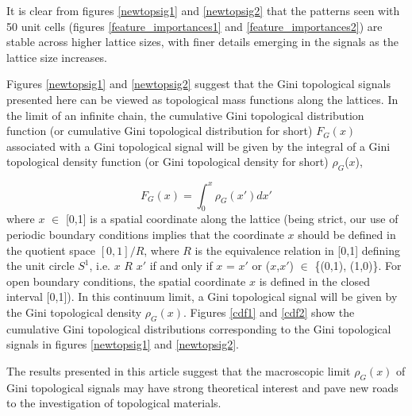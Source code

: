 \documentclass[fleqn,10pt]{wlscirep}
\begin{document}
It is clear from figures \ref{newtopsig1} and \ref{newtopsig2} that the patterns seen with 50 unit cells (figures \ref{feature_importances1} and \ref{feature_importances2}) are stable across higher lattice sizes, with finer details emerging in the signals as the lattice size increases.

Figures \ref{newtopsig1} and \ref{newtopsig2} suggest that the Gini topological signals presented here can be viewed as topological mass functions along the lattices. In the limit of an infinite chain, the cumulative Gini topological distribution function (or cumulative Gini topological distribution for short) $F_G(x)$ associated with a Gini topological signal will be given by the integral of a Gini topological density function (or Gini topological density for short) $\rho_G$($x$),

\begin{equation}
\label{entropy_dens}
F_G(x) = \int_{0}^x\rho_G(x')dx'
\end{equation}
where $x$ $\in$ [0,1] is a spatial coordinate along the lattice (being strict, our use of periodic boundary conditions implies that the coordinate $x$ should be defined in the quotient space $[0,1]/R$, where $R$ is the equivalence relation in [0,1] defining the unit circle $S^1$, i.e. $x$ $R$ $x'$ if and only if $x$ = $x'$ or ($x$,$x'$) $\in$ \{(0,1), (1,0)\}. For open boundary conditions, the spatial coordinate $x$ is defined in the closed interval [0,1]). In this continuum limit, a Gini topological signal will be given by the Gini topological density $\rho_G(x)$. Figures \ref{cdf1} and \ref{cdf2} show the cumulative Gini topological distributions corresponding to the Gini topological signals in figures \ref{newtopsig1} and \ref{newtopsig2}.

The results presented in this article suggest that the macroscopic limit $\rho_G(x)$ of Gini topological signals may have strong theoretical interest and pave new roads to the investigation of topological materials.
\end{document}
